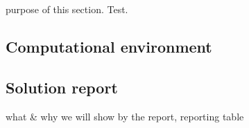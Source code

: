 %
%


purpose of this section. Test.

\subsection{Computational environment}


\subsection{Solution report}
what \& why we will show by the report, reporting table


